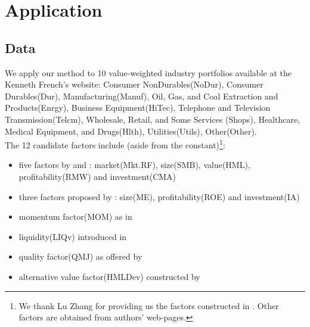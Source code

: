 \section{Application}
\subsection{Data}
We apply our method to 10 value-weighted industry portfolios available at the Kenneth French's website: Consumer NonDurables(NoDur), Consumer Durables(Dur), Manufacturing(Manuf),  Oil, Gas, and Coal Extraction and Products(Enrgy), Business Equipment(HiTec),   Telephone and Television Transmission(Telcm),   Wholesale, Retail, and Some Services (Shops),
Healthcare, Medical Equipment, and Drugs(Hlth),
Utilities(Utils), Other(Other). \\
The 12 candidate factors include (aside from the constant)\footnote{We thank Lu Zhang for providing us the factors constructed in \cite{hou2014digesting}. Other factors are obtained from authors' web-pages.}:
\begin{itemize}
	\item five factors by \cite{fama1993common} and \cite{fama2015five}: market(Mkt.RF), size(SMB), value(HML), profitability(RMW) and investment(CMA)
	\item three factors proposed by \cite{hou2014digesting}: size(ME), profitability(ROE) and investment(IA)
	\item momentum factor(MOM) as in \cite{carhart1997persistence}
	\item liquidity(LIQv) introduced in \cite{stambaugh2003liquidity}
	\item quality factor(QMJ) as offered by \cite{asness2014quality}
	\item alternative value factor(HMLDev) constructed by \cite{asness2013devil}
\end{itemize}

